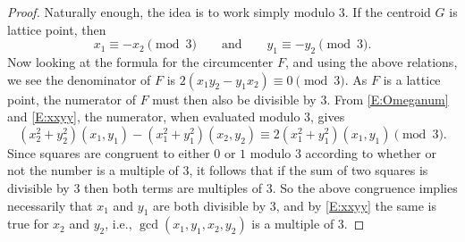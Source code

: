 \documentclass[10pt,a4paper]{amsart}
\begin{document}
\begin{proof}
Naturally enough, the idea is  to work simply modulo $3$. If the centroid $G$ is lattice point, then 
\begin{equation}\label{E:xxyy}
x_1\equiv -x_2\pmod3\qquad\text{and}\qquad y_1\equiv -y_2\pmod3.
\end{equation}
Now looking at the formula for the circumcenter $F$,  and using the above relations,  we see the denominator of $F$ is $2(x_1 y_2-y_1 x_2) \equiv 0\pmod3$. As $F$ is a lattice point, the numerator of $F$ must then also be divisible by $3$.
From \eqref{E:Omeganum} and \eqref{E:xxyy}, the numerator, when evaluated modulo $3$,
 gives
\[
(x_2^2+y_2^2)(x_1,y_1) - (x_1^2+y_1^2)(x_2,y_2)\equiv 2(x_1^2+y_1^2)(x_1,y_1)\pmod3.
\]
Since squares are congruent to either $0$ or $1$ modulo $3$ according to whether or not the number is a multiple of $3$, it follows that if the sum of two squares is divisible by $3$ then both terms are multiples of $3$. So the above congruence implies necessarily that $x_1$ and $y_1$ are both divisible by $3$, and by  \eqref{E:xxyy} the same is true for $x_2$ and $y_2$, i.e., $\gcd(x_1,y_1,x_2,y_2)$ is a multiple of $3$.
\end{proof}
\end{document}

